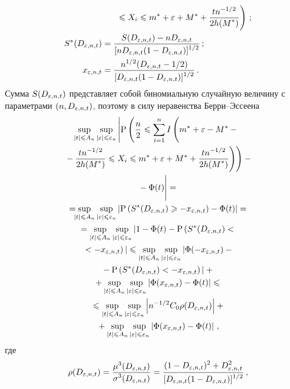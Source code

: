 \begin{multicols}{2}
\begin{align*}
&\hspace*{5mm}\left.{}{}\leqslant X_i\leqslant m^*+\varepsilon+M^*+\displaystyle\frac{\displaystyle tn^{-1/2}\mathstrut}{\displaystyle 2h(M^*)\mathstrut}\right)\,;
\\
S^*(D_{\varepsilon,n,t})&=\displaystyle\frac{\displaystyle S(D_{\varepsilon,n,t})-nD_{\varepsilon,n,t}\mathstrut}{\displaystyle [nD_{\varepsilon,n,t}(1-D_{\varepsilon,n,t})]^{1/2}\mathstrut}\,;
\\
x_{\varepsilon,n,t}&=\displaystyle\frac{\displaystyle n^{1/2}(D_{\varepsilon,n,t}-1/2)\mathstrut}{\displaystyle [D_{\varepsilon,n,t}(1-D_{\varepsilon,n,t})]^{1/2}\mathstrut}\,.
\end{align*}
Сумма $S(D_{\varepsilon,n,t})$ представляет собой биномиальную случайную величину с параметрами $(n,D_{\varepsilon,n,t})$, поэтому в силу неравенства Берри--Эссеена
\begin{multline}
\sup\limits_{\abs{t}\leqslant A_n}\sup\limits_{\abs{\eps}\leqslant \eps_n}\left|
\mbox{P}\left(\fr{n}{2}\leqslant\sum\limits_{i=1}^{n}I
\left(
\vphantom{\fr{tn^{-1/2}}{2h(M^*)}}
m^*+\eps-M^*-{}\right.\right.\right.\\
\left.\left.\left.{}-\fr{tn^{-1/2}}{2h(M^*)}
\leqslant X_i\leqslant m^*+\eps+M^*+
\fr{tn^{-1/2}}{2h(M^*)}\right)\right)-{}\right.\\
\left.{}-\Phi(t)
\vphantom{\fr{tn^{-1/2}}{2h(M^*)}}\right|={}\\
{}=\!\!\!\sup\limits_{\abs{t}\leqslant A_n}\sup\limits_{\abs{\eps}\leqslant 
\eps_n}\abs{\mbox{P}\left(S^*(D_{\eps,n,t})\geqslant-x_{\eps,n,t}\right)-\Phi(t)}={}\\
{}=\sup\limits_{\abs{t}\leqslant A_n}
\sup\limits_{\abs{\eps}\leqslant \eps_n}\vert1-\Phi(t)-
\mbox{P}\left(S^*(D_{\eps,n,t})<{}\right.\\
\left.{}<-x_{\eps,n,t}\right)\vert
\leqslant\sup\limits_{\abs{t}\leqslant A_n}\sup\limits_{\abs{\eps}\leqslant 
\eps_n}\vert\Phi(-x_{\eps,n,t})-{}\\
{}-\mbox{P}\left(S^*(D_{\eps,n,t})<-x_{\eps,n,t}\right)\vert+{}\\
{}+\sup\limits_{\abs{t}\leqslant A_n}\sup\limits_{\abs{\eps}\leqslant \eps_n}
\abs{\Phi(x_{\eps,n,t})-\Phi(t)}\leqslant{}\\
{}\leqslant\sup\limits_{\abs{t}\leqslant A_n}
\sup\limits_{\abs{\eps}\leqslant \eps_n}\abs{n^{-1/2}C_0\rho(D_{\eps,n,t})}+{}\\
{}+\sup\limits_{\abs{t}\leqslant A_n}\sup\limits_{\abs{\eps}\leqslant \eps_n}\abs{\Phi(x_{\eps,n,t})-\Phi(t)}\,,
\label{e13-sh}
\end{multline}
где
$$
\rho(D_{\varepsilon,n,t})=\displaystyle\frac{\displaystyle \mu^3(D_{\varepsilon,n,t})\mathstrut}{\displaystyle \sigma^3(D_{\varepsilon,n,t})\mathstrut}=
\displaystyle\frac{\displaystyle (1-D_{\varepsilon,n,t})^2+D^2_{\varepsilon,n,t}\mathstrut}{\displaystyle [D_{\varepsilon,n,t}(1-D_{\varepsilon,n,t})]^{1/2}\mathstrut}\,,
$$

\vspace*{-6pt}


\end{multicols}
